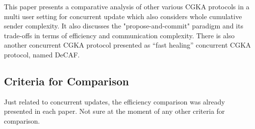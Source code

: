 This paper presents a comparative analysis of other various CGKA protocols in a multi user setting for concurrent update which also considers whole cumulative sender complexity. It also discusses the "propose-and-commit" paradigm and its trade-offs in terms of efficiency and communication complexity. There is also another concurrent CGKA protocol presented as “fast healing” concurrent CGKA protocol, named DeCAF.
\cite{EPRINT:AANKPP22}


\subsection{Criteria for Comparison}

Just related to concurrent updates, the efficiency comparison was already presented in each paper. Not sure at the moment of any other criteria for comparison.

